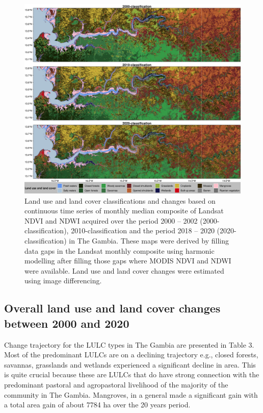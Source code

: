 \documentclass[utf8]{frontiersSCNS}
\begin{document}
\begin{figure}
\includegraphics[width=1\linewidth]{figures/Gambia_classifications} \caption{Land use and land cover classifications and changes based on continuous time series of monthly median composite of Landsat NDVI and NDWI acquired over the period 2000 – 2002 (2000-classification), 2010-classification and the period 2018 – 2020 (2020-classification) in The Gambia. These maps were derived by filling data gaps in the Landsat monthly composite using harmonic modelling after filling those gaps where MODIS NDVI and NDWI were available. Land use and land cover changes were estimated using image differencing.}\label{fig:fig3}
\end{figure}

\hypertarget{ref42}{%
\subsection{Overall land use and land cover changes between 2000 and
2020}\label{ref42}}

Change trajectory for the LULC types in The Gambia are presented in
Table 3. Most of the predominant LULCs are on a declining trajectory
e.g., closed forests, savannas, grasslands and wetlands experienced a
significant decline in area. This is quite crucial because these are
LULCs that do have strong connection with the predominant pastoral and
agropastoral livelihood of the majority of the community in The Gambia.
Mangroves, in a general made a significant gain with a total area gain
of about 7784 ha over the 20 years period.
\end{document}
